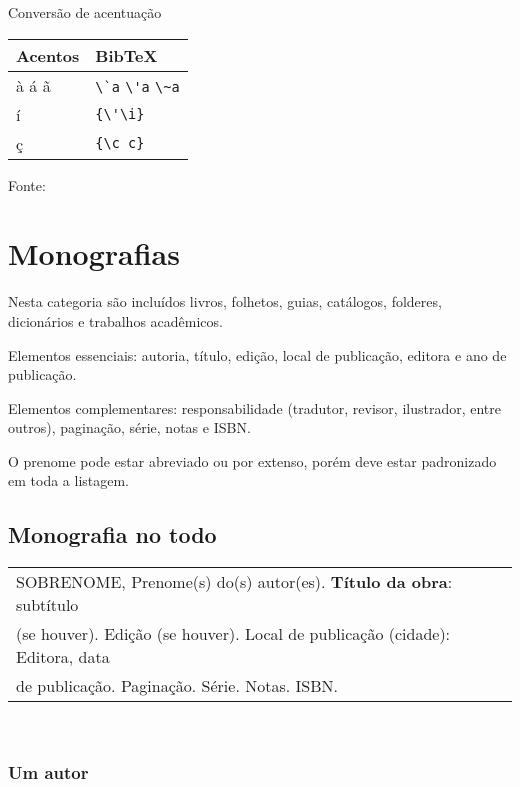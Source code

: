 \begin{quadro}[H]
	\caption{\label{quadro-acentos}Conversão de acentuação}
		\begin{tabular}{|p{7.5cm}|p{7.5cm}|}
			\hline
			\textbf{Acentos} & \textbf{BibTeX}\\
			\hline
			à á ã & \verb+\`a+ \verb+\'a+ \verb+\~a+\\
			\hline
			í & \verb+{\'\i}+\\
			\hline
			ç & \verb+{\c c}+\\
			\hline
		\end{tabular}
		\begin{flushleft}
			Fonte: 
		\end{flushleft}	
\end{quadro}


\section{Monografias}

Nesta categoria são incluídos livros, folhetos, guias, catálogos, folderes, dicionários e trabalhos acadêmicos.

Elementos essenciais: autoria, título, edição, local de publicação, editora e ano de publicação.

Elementos complementares: responsabilidade (tradutor, revisor, ilustrador, entre outros), paginação, série, notas e ISBN.

O prenome pode estar abreviado ou por extenso, porém deve estar padronizado em toda a listagem. \\

\subsection{Monografia no todo}

\begin{tabular}{|l|c|} \hline
SOBRENOME, Prenome(s) do(s) autor(es). \textbf{Título da obra}: subtítulo \\ (se houver). Edição (se houver). Local de publicação (cidade):	Editora, data \\
de publicação.  Paginação. Série. Notas. ISBN.\\\hline
\end{tabular}\\

\subsubsection{Um autor}

